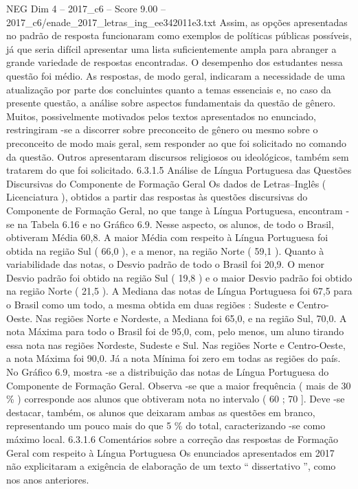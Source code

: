 \begin{textsample}{NEG Dim 4 – 2017\_c6 – Score 9.00 – 2017\_c6/enade\_2017\_letras\_ing\_ee342011e3.txt}
Assim, as opções apresentadas no padrão de resposta funcionaram como exemplos de políticas públicas possíveis, já que seria difícil apresentar uma lista suficientemente ampla para abranger a grande variedade de respostas encontradas.
O desempenho dos estudantes nessa questão foi médio.
As respostas, de modo geral, indicaram a necessidade de uma atualização por parte dos concluintes quanto a temas essenciais e, no caso da presente questão, a análise sobre aspectos fundamentais da questão de gênero.
Muitos, possivelmente motivados pelos textos apresentados no enunciado, restringiram -se a discorrer sobre preconceito de gênero ou mesmo sobre o preconceito de modo mais geral, sem responder ao que foi solicitado no comando da questão.
Outros apresentaram discursos religiosos ou ideológicos, também sem tratarem do que foi solicitado. 6.3.1.5 Análise de Língua Portuguesa das Questões Discursivas do Componente de Formação Geral Os dados de Letras–Inglês ( Licenciatura ), obtidos a partir das respostas às questões discursivas do Componente de Formação Geral, no que tange à Língua Portuguesa, encontram -se na Tabela 6.16 e no Gráfico 6.9.
Nesse aspecto, os alunos, de todo o Brasil, obtiveram Média 60,8.
A maior Média com respeito à Língua Portuguesa foi obtida na região Sul ( 66,0 ), e a menor, na região Norte ( 59,1 ).
Quanto à variabilidade das notas, o Desvio padrão de todo o Brasil foi 20,9.
O menor Desvio padrão foi obtido na região Sul ( 19,8 ) e o maior Desvio padrão foi obtido na região Norte ( 21,5 ).
A Mediana das notas de Língua Portuguesa foi 67,5 para o Brasil como um todo, a mesma obtida em duas regiões : Sudeste e Centro-Oeste.
Nas regiões Norte e Nordeste, a Mediana foi 65,0, e na região Sul, 70,0.
A nota Máxima para todo o Brasil foi de 95,0, com, pelo menos, um aluno tirando essa nota nas regiões Nordeste, Sudeste e Sul.
Nas regiões Norte e Centro-Oeste, a nota Máxima foi 90,0.
Já a nota Mínima foi zero em todas as regiões do país.
No Gráfico 6.9, mostra -se a distribuição das notas de Língua Portuguesa do Componente de Formação Geral.
Observa -se que a maior frequência ( mais de 30 \% ) corresponde aos alunos que obtiveram nota no intervalo ( 60 ; 70 ].
Deve -se destacar, também, os alunos que deixaram ambas as questões em branco, representando um pouco mais do que 5 \% do total, caracterizando -se como máximo local. 6.3.1.6 Comentários sobre a correção das respostas de Formação Geral com respeito à Língua Portuguesa Os enunciados apresentados em 2017 não explicitaram a exigência de elaboração de um texto “ dissertativo ”, como nos anos anteriores.

\end{textsample}
